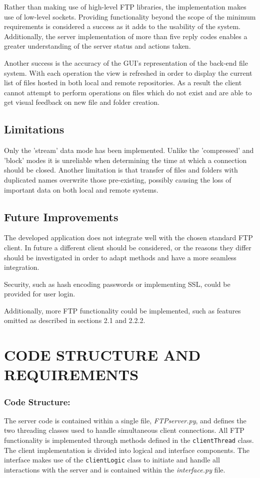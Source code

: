 \documentclass[10pt,twocolumn]{witseiepaper}
\begin{document}
Rather than making use of high-level FTP libraries, the implementation makes use of low-level sockets. Providing functionality beyond the scope of the minimum requirements is considered a success as it adds to the usability of the system. Additionally, the server implementation of more than five reply codes enables a greater understanding of the server status and actions taken.

Another success is the accuracy of the GUI's representation of the back-end file system. With each operation the view is refreshed in order to display the current list of files hosted in both local and remote repositories. As a result the client cannot attempt to perform operations on files which do not exist and are able to get visual feedback on new file and folder creation.

\subsection{Limitations}
Only the 'stream' data mode has been implemented. Unlike the 'compressed' and 'block' modes it is unreliable when determining the time at which a connection should be closed. Another limitation is that transfer of files and folders with duplicated names overwrite those pre-existing, possibly causing the loss of important data on both local and remote systems.

\subsection{Future Improvements}
The developed application does not integrate well with the chosen standard FTP client. In future a different client should be considered, or the reasons they differ should be investigated in order to adapt methods and have a more seamless integration.

Security, such as hash encoding passwords or implementing SSL, could be provided for user login.

Additionally, more FTP functionality could be implemented, such as features omitted as described in sections 2.1 and 2.2.2.
\section{CODE STRUCTURE AND REQUIREMENTS}

\subsubsection*{Code Structure: } The server code is contained within a single file, \textit{FTPserver.py}, and defines the two threading classes used to handle simultaneous client connections. All FTP functionality is implemented through methods defined in the \texttt{clientThread} class. The client implementation is divided into logical and interface components. The interface makes use of the \texttt{clientLogic} class to initiate and handle all interactions with the server and is contained within the \textit{interface.py} file.  
 
\end{document}
